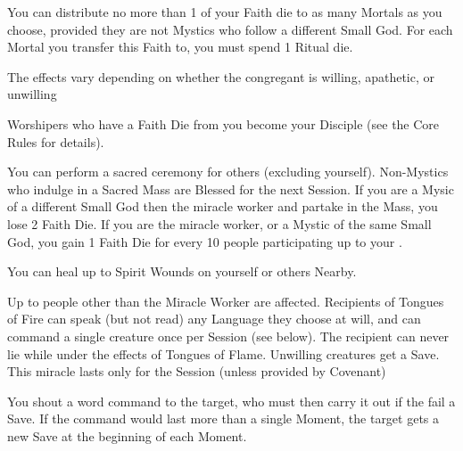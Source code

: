 {You can distribute no more than 1 of your Faith die to as many Mortals as you choose, provided they are not Mystics who follow a different Small God.  For each Mortal you transfer this Faith to, you must spend 1 Ritual die.

The effects vary depending on whether the congregant is willing, apathetic, or unwilling


Worshipers who have a Faith Die from you become your Disciple (see the Core Rules for details).


You can perform a sacred ceremony for \SUMDICE others (excluding yourself).  Non-Mystics who indulge in a Sacred Mass are Blessed for the next Session.  If you are a Mysic of a different Small God then the miracle worker and partake in the Mass, you lose 2 Faith Die.  If you are the miracle worker, or a Mystic of the same Small God, you gain 1 Faith Die for every 10 people participating up to your \LVL.





You can heal up to \DICE Spirit Wounds on yourself or others Nearby.




Up to \SUMDICE people other than the Miracle Worker are affected.  Recipients of Tongues of Fire can speak (but not read) any Language they choose at will, and can command a single creature once per Session (see below).  The recipient can never lie while under the effects of Tongues of Flame.  Unwilling creatures get a Save.  This miracle lasts only for the Session (unless provided by Covenant)



\LITURGY [
  Name= Command,
  Link=miracle-command,
  Paradigm=Mind,
  Save=Y,
  Duration=0 ,
  Counter= n/a  ,
  Keywords=None ,
  Target=Nearby creature
]

You shout a \DICE word command to the target, who must then carry it out if the fail a Save.  If the command would last more than a single Moment, the target gets a new Save at the beginning of each Moment.




}%